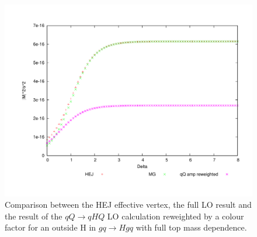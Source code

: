 \begin{figure}[t]
\centering
\includegraphics[scale=0.5]{Images/qg_qgH_outside.pdf}
\caption{Comparison between the HEJ effective vertex, the full LO result and the result of the $qQ \to qHQ$ LO calculation reweighted by a colour factor for an outside H in $gq \to Hgq$ with full top mass dependence.}
\label{fig:gu_ghu_out}
\end{figure}

